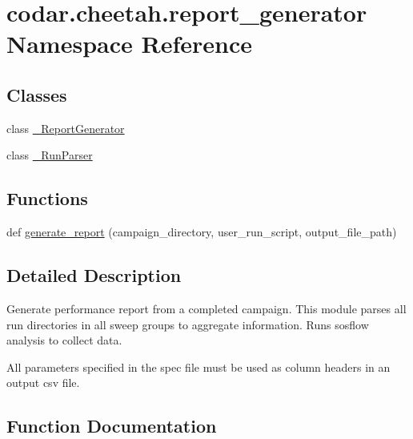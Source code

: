 \hypertarget{namespacecodar_1_1cheetah_1_1report__generator}{}\section{codar.\+cheetah.\+report\+\_\+generator Namespace Reference}
\label{namespacecodar_1_1cheetah_1_1report__generator}
\subsection*{Classes}
\begin{DoxyCompactItemize}
\item 
class \hyperlink{classcodar_1_1cheetah_1_1report__generator_1_1___report_generator}{\+\_\+\+Report\+Generator}
\item 
class \hyperlink{classcodar_1_1cheetah_1_1report__generator_1_1___run_parser}{\+\_\+\+Run\+Parser}
\end{DoxyCompactItemize}
\subsection*{Functions}
\begin{DoxyCompactItemize}
\item 
def \hyperlink{namespacecodar_1_1cheetah_1_1report__generator_ae70d0b8a31614392ed054afbd5f5e0c9}{generate\+\_\+report} (campaign\+\_\+directory, user\+\_\+run\+\_\+script, output\+\_\+file\+\_\+path)
\end{DoxyCompactItemize}


\subsection{Detailed Description}
\begin{DoxyVerb}Generate performance report from a completed campaign.
This module parses all run directories in all sweep groups to aggregate
information.
Runs sosflow analysis to collect data.

All parameters specified in the spec file must be used as column headers in
an output csv file.
\end{DoxyVerb}
 

\subsection{Function Documentation}
\mbox{\label{namespacecodar_1_1cheetah_1_1report__generator_ae70d0b8a31614392ed054afbd5f5e0c9}} 
